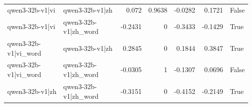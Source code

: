 \begin{table}
\begin{tabular}{l l r r r r l}
qwen3-32b-v1|vi & qwen3-32b-v1|zh & 0.072 & 0.9638 & -0.0282 & 0.1721 & False \\
qwen3-32b-v1|vi & qwen3-32b-v1|zh_word & -0.2431 & 0 & -0.3433 & -0.1429 & True \\
qwen3-32b-v1|vi_word & qwen3-32b-v1|zh & 0.2845 & 0 & 0.1844 & 0.3847 & True \\
qwen3-32b-v1|vi_word & qwen3-32b-v1|zh_word & -0.0305 & 1 & -0.1307 & 0.0696 & False \\
qwen3-32b-v1|zh & qwen3-32b-v1|zh_word & -0.3151 & 0 & -0.4152 & -0.2149 & True \\
\bottomrule
\end{tabular}
\end{table}
